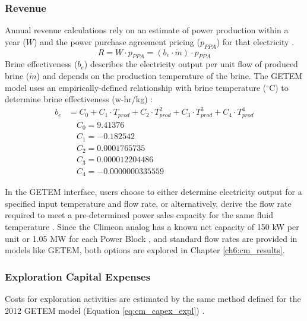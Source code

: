 \subsubsection{Revenue}\label{ch4:cm_rev}
Annual revenue calculations rely on an estimate of power production within a year ($W$) and the power purchase agreement pricing ($p_{PPA}$) for that electricity \citep{entingh_volume_2006}. 
\begin{equation}
    \label{eq:cm_rev}
    R = W \cdot p_{PPA} = (b_e \cdot \dot{m}) \cdot p_{PPA}
\end{equation}
Brine effectiveness ($b_e$) describes the electricity output per unit flow of produced brine ($\dot{m}$) and depends on the production temperature of the brine. The GETEM model uses an empirically-defined relationship with brine temperature ($^\circ$C) to determine brine effectiveness (w-hr/kg) \citep[p.\ 62]{entingh_volume_2006}:
\begin{equation}
\begin{aligned}
    \label{eq:brine_eff}
    b_e &= C_0 + C_1 \cdot T_{prod} + C_2 \cdot T_{prod}^2 + C_3 \cdot T_{prod}^3 + C_4 \cdot T_{prod}^4 \\
    &\quad C_0 = 9.41376 \\
    &\quad C_1 = -0.182542 \\
    &\quad C_2 = 0.0001765735 \\
    &\quad C_3 = 0.000012204486 \\
    &\quad C_4 = -0.0000000335559
\end{aligned}
\end{equation}

In the GETEM interface, users choose to either determine electricity output for a specified input temperature and flow rate, or alternatively, derive the flow rate required to meet a pre-determined power sales capacity for the same fluid temperature \citep{entingh_volume_2006}. Since the Climeon analog has a known net capacity of 150 kW per unit or 1.05 MW for each Power Block \citep{climeon_climeon_2021-1}, and standard flow rates are provided in models like GETEM, both options are explored in Chapter \ref{ch6:cm_results}.

\subsubsection{Exploration Capital Expenses}\label{ch4:cm_capex_expl}
Costs for exploration activities are estimated by the same method defined for the 2012 GETEM model (Equation \ref{eq:cm_capex_expl}) \citep{eere_getem_2012}. 

